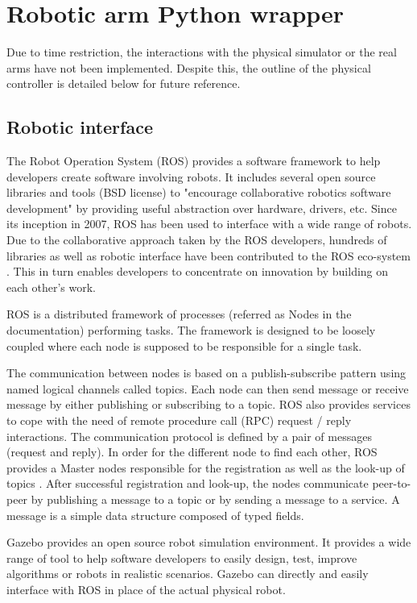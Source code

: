\chapter{Robotic arm Python wrapper}
\label{app:ros-overview}	
Due to time restriction, the interactions with the physical simulator or the real arms have not been implemented. Despite this, the outline of the physical controller is detailed below for future reference.

\section{Robotic interface}

The Robot Operation System (ROS) provides a software framework to help developers create software involving robots. It includes several open source libraries and tools (BSD license) to "encourage collaborative robotics software development" by providing useful abstraction over hardware, drivers, etc. Since its inception in 2007, ROS has been used to interface with a wide range of robots. Due to the collaborative approach taken by the ROS developers, hundreds of libraries as well as robotic interface have been contributed to the ROS eco-system \cite{noauthor_robot_2017}. This in turn enables developers to concentrate on innovation by building on each other's work. 

ROS is a distributed framework of processes (referred as Nodes in the documentation) performing tasks. The framework is designed to be loosely coupled where each node is supposed to be responsible for a single task. 

The communication between nodes is based on a publish-subscribe pattern using named logical channels called topics. Each node can then send message or receive message by either publishing or subscribing to a topic. ROS also provides services to cope with the need of remote procedure call (RPC) request / reply interactions. The communication protocol is defined by a pair of messages (request and reply). In order for the different node to find each other, ROS provides a Master nodes responsible for the registration as well as the look-up of topics \cite{noauthor_master_nodate}. After successful registration and look-up, the nodes communicate peer-to-peer by publishing a message to a topic or by sending a message to a service. A message is a simple data structure composed of typed fields.

Gazebo provides an open source robot simulation environment. It provides a wide range of tool to help software developers to easily design, test, improve algorithms or robots in realistic scenarios. Gazebo can directly and easily interface with ROS in place of the actual physical robot.

